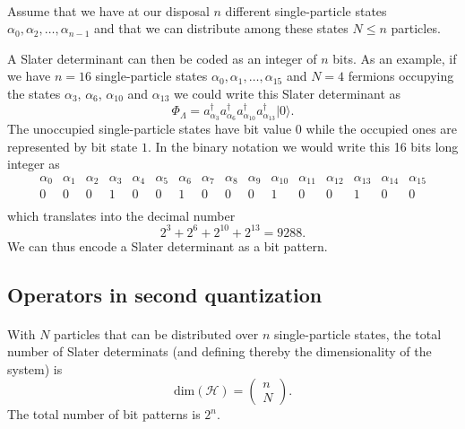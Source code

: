 \paragraph{}
Assume that we have at our disposal $n$ different single-particle states
$\alpha_0,\alpha_2,\dots,\alpha_{n-1}$ and that we can distribute  among these states $N\le n$ particles.

A Slater  determinant can then be coded as an integer of $n$ bits. As an example, if we have $n=16$ single-particle states
$\alpha_0,\alpha_1,\dots,\alpha_{15}$ and $N=4$ fermions occupying the states $\alpha_3$, $\alpha_6$, $\alpha_{10}$ and $\alpha_{13}$
we could write this Slater determinant as  
\[
\Phi_{\Lambda} = a_{\alpha_3}^{\dagger} a_{\alpha_6}^{\dagger} a_{\alpha_{10}}^{\dagger} a_{\alpha_{13}}^{\dagger} |0\rangle.
\]
The unoccupied single-particle states have bit value $0$ while the occupied ones are represented by bit state $1$. 
In the binary notation we would write this   16 bits long integer as
\[
\begin{array}{cccccccccccccccc}
{\alpha_0}&{\alpha_1}&{\alpha_2}&{\alpha_3}&{\alpha_4}&{\alpha_5}&{\alpha_6}&{\alpha_7} & {\alpha_8} &{\alpha_9} & {\alpha_{10}} &{\alpha_{11}} &{\alpha_{12}} &{\alpha_{13}} &{\alpha_{14}} & {\alpha_{15}} \\
{0} & {0} &{0} &{1} &{0} &{0} &{1} &{0} &{0} &{0} &{1} &{0} &{0} &{1} &{0} & {0} \\
\end{array}
\]
which translates into the decimal number
\[
2^3+2^6+2^{10}+2^{13}=9288.
\]
We can thus encode a Slater determinant as a bit pattern.



\subsection*{Operators in second quantization}

\paragraph{}
With $N$ particles that can be distributed over $n$ single-particle states, the total number of Slater determinats (and defining thereby the dimensionality of the system) is
\[
\mathrm{dim}(\mathcal{H}) = \left(\begin{array}{c} n \\N\end{array}\right).
\]
The total number of bit patterns is $2^n$.



